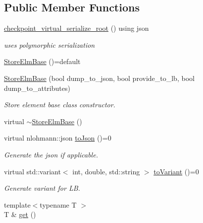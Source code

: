 \subsection*{Public Member Functions}
\begin{DoxyCompactItemize}
\item 
\hyperlink{structvt_1_1vrt_1_1collection_1_1storage_1_1_store_elm_base_ace4bb0073e5de18f3743ca10c31fdf2d}{checkpoint\+\_\+virtual\+\_\+serialize\+\_\+root} () using json
\begin{DoxyCompactList}\small\item\em uses polymorphic serialization \end{DoxyCompactList}\item 
\hyperlink{structvt_1_1vrt_1_1collection_1_1storage_1_1_store_elm_base_a7fa798418159b33d18f1b4a687c727c1}{Store\+Elm\+Base} ()=default
\item 
\hyperlink{structvt_1_1vrt_1_1collection_1_1storage_1_1_store_elm_base_af8642b88e64da984612fd8c7ccdb7778}{Store\+Elm\+Base} (bool dump\+\_\+to\+\_\+json, bool provide\+\_\+to\+\_\+lb, bool dump\+\_\+to\+\_\+attributes)
\begin{DoxyCompactList}\small\item\em Store element base class constructor. \end{DoxyCompactList}\item 
virtual \hyperlink{structvt_1_1vrt_1_1collection_1_1storage_1_1_store_elm_base_a564f20122fff98f72f65752ce610f05e}{$\sim$\+Store\+Elm\+Base} ()
\item 
virtual nlohmann\+::json \hyperlink{structvt_1_1vrt_1_1collection_1_1storage_1_1_store_elm_base_a3c207bb3612dba2db9fef7e0e7f2e717}{to\+Json} ()=0
\begin{DoxyCompactList}\small\item\em Generate the json if applicable. \end{DoxyCompactList}\item 
virtual std\+::variant$<$ int, double, std\+::string $>$ \hyperlink{structvt_1_1vrt_1_1collection_1_1storage_1_1_store_elm_base_a1cfa9cc885ea3f22678b80701498c0ff}{to\+Variant} ()=0
\begin{DoxyCompactList}\small\item\em Generate variant for LB. \end{DoxyCompactList}\item 
{\footnotesize template$<$typename T $>$ }\\T \& \hyperlink{structvt_1_1vrt_1_1collection_1_1storage_1_1_store_elm_base_aa20aab1f18c5c993151f556d03296441}{get} ()

\end{DoxyCompactItemize}
